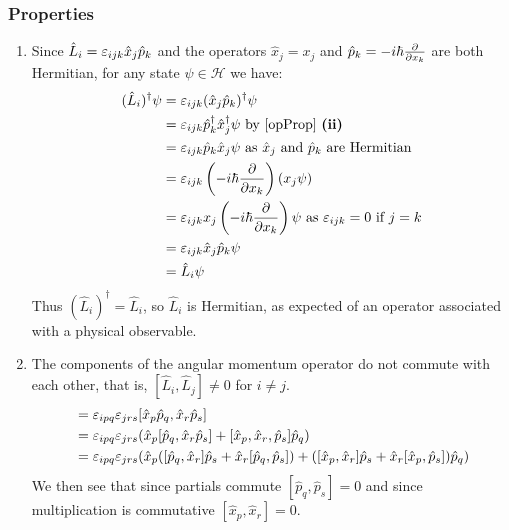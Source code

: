 \documentclass[../main.tex]{subfiles}
\begin{document}
\subsubsection{Properties}
\begin{enumerate}
  \item Since $\hat{L}_i = \varepsilon_{i j k} \hat{x}_j \hat{p}_k$ and the operators $\hat{x}_j = x_j$ and $\hat{p}_k = -i\hbar \pderiv{}{x_k}$ are both Hermitian, for any state $\psi \in \mathcal{H}$ we have:
    \begin{align*}
      (\hat{L}_i)^{\dag}\psi &= \levi_{i j k}(\hat{x}_j \hat{p}_k)^{\dag}\psi \\
                             &= \levi_{i j k}\hat{p}^{\dag}_k \hat{x}^{\dag}_j\psi \text{ by \cref{opProp} \textbf{(ii)}} \\
                             &= \levi_{i j k}\hat{p}_k \hat{x}_j\psi \text{ as $\hat{x}_j$ and $\hat{p}_k$ are Hermitian} \\
                             &= \levi_{i j k}\left(-i\hbar \pderiv{}{x_k}\right)(x_j\psi) \\
                             &= \levi_{i j k} x_j \left(-i\hbar \pderiv{}{x_k}\right)\psi \text{ as $\levi_{i j k} = 0$ if $j = k$} \\
                             &= \levi_{i j k} \hat{x}_j \hat{p}_k \psi \\
                             &= \hat{L}_i\psi
    \end{align*}
    Thus $(\hat{L}_i)^{\dag} = \hat{L}_i$, so $\hat{L}_i$ is Hermitian, as expected of an operator associated with a physical observable.
  \item The components of the angular momentum operator do not commute with each other, that is, $[\hat{L}_i, \hat{L}_j] \neq 0$ for $i \neq j$.
    \begin{align*}
      [\hat{L}_i, \hat{L}_j] &= \levi_{i p q} \levi_{j r s} [\hat{x}_p \hat{p}_q, \hat{x}_r \hat{p}_s] \\
                             &= \levi_{i p q} \levi_{j r s} (\hat{x}_p[\hat{p}_q, \hat{x}_r \hat{p}_s] + [\hat{x}_p, \hat{x}_r, \hat{p}_s]\hat{p}_q) \\
                             &= \levi_{i p q} \levi_{j r s} (\hat{x}_p([\hat{p}_q, \hat{x}_r]\hat{p}_s + \hat{x}_r[\hat{p}_q, \hat{p}_s]) + ([\hat{x}_p, \hat{x}_r]\hat{p}_s + \hat{x}_r[\hat{x}_p, \hat{p}_s])\hat{p}_q)
    \end{align*}
    We then see that since partials commute $[\hat{p}_q, \hat{p}_s] = 0$ and since multiplication is commutative $[\hat{x}_p, \hat{x}_r] = 0$.

\end{enumerate}
\end{document}
